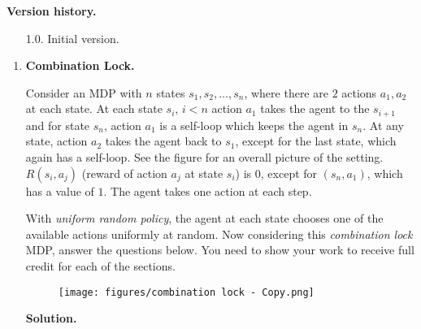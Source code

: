 \documentclass{article}
\theoremstyle{definition}
\theoremstyle{remark}
\newenvironment{Q}
{%
\clearpage
\item
}
{%
\phantom{s}%
\bigskip%
\noindent\textbf{Solution.}
}
\begin{document}
\noindent\textbf{Version history.}
\begin{enumerate}
    \item[1.0.] Initial version.
\end{enumerate}

\begin{enumerate}[font={\Large\bfseries},left=0pt]

\begin{Q}
  \textbf{\Large{}Combination Lock.}

    Consider an MDP with $n$ states $s_1, s_2, \dots, s_n$, where there are $2$ actions $a_1, a_2$ at each state. At each state $s_i,\, i < n$ action $a_1$ takes the agent to the $s_{i+1}$ and for state $s_n$, action $a_1$ is a self-loop which keeps the agent in $s_n$. At any state, action $a_2$ takes the agent back to $s_1$, except for the last state, which again has a self-loop. See the figure for an overall picture of the setting. $R(s_i, a_j)$ (reward of action $a_j$ at state $s_i$) is $0$, except for $(s_n, a_1)$, which has a value of $1$. The agent takes one action at each step. 

    With \textit{uniform random policy}, the agent at each state chooses one of the available actions uniformly at random. Now considering this \textit{combination lock} MDP, answer the questions below. You need to show your work to receive full credit for each of the sections.


\vspace{15pt}

    \begin{figure}[h]
    \texttt{[image: figures/combination lock - Copy.png]}
    \centering
    \end{figure}

\vspace{15pt}


\end{Q}
\end{enumerate}
\end{document}
